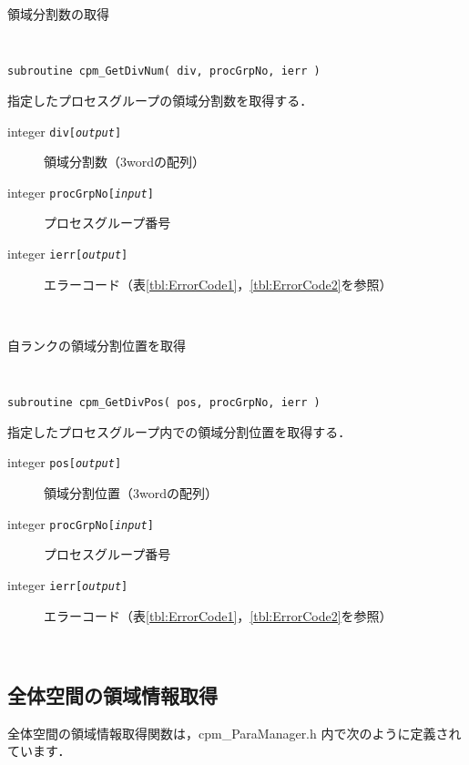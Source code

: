\begin{spacing}{0.8}
\begin{itembox}[l]{領域分割数の取得}
{\tt
\begin{verbatim}
subroutine cpm_GetDivNum( div, procGrpNo, ierr )
\end{verbatim}
}
指定したプロセスグループの領域分割数を取得する．
\begin{description}
\item[integer {\tt div[{\it output}]}] 領域分割数（3wordの配列）
\item[integer {\tt procGrpNo[{\it input}]}] プロセスグループ番号
\item[integer {\tt ierr[{\it output}]}] エラーコード（表\ref{tbl:ErrorCode1}，\ref{tbl:ErrorCode2}を参照）
\end{description}
\end{itembox}\\
\end{spacing}

\begin{spacing}{0.8}
\begin{itembox}[l]{自ランクの領域分割位置を取得}
{\tt
\begin{verbatim}
subroutine cpm_GetDivPos( pos, procGrpNo, ierr )
\end{verbatim}
}
指定したプロセスグループ内での領域分割位置を取得する．
\begin{description}
\item[integer {\tt pos[{\it output}]}] 領域分割位置（3wordの配列）
\item[integer {\tt procGrpNo[{\it input}]}] プロセスグループ番号
\item[integer {\tt ierr[{\it output}]}] エラーコード（表\ref{tbl:ErrorCode1}，\ref{tbl:ErrorCode2}を参照）
\end{description}
\end{itembox}\\
\end{spacing}


\clearpage


\subsection{全体空間の領域情報取得}
\label{globalInfoF}
全体空間の領域情報取得関数は，cpm\_ParaManager.h 内で次のように定義されています．\\

